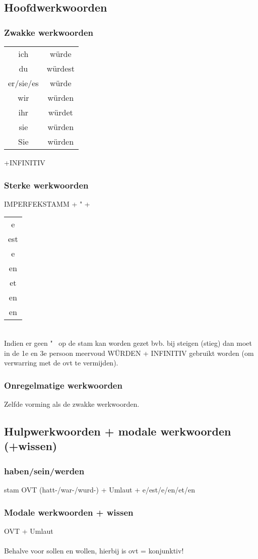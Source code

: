 \documentclass[main.tex]{subfiles}
\begin{document}
\subsection{Hoofdwerkwoorden}
\subsubsection{Zwakke werkwoorden}
\begin{tabular}{cc}

ich & würde \\ 

du & würdest \\ 

er/sie/es & würde \\ 

wir & würden \\ 

ihr & würdet \\ 
 
sie & würden \\ 
Sie & würden  
\end{tabular} 
+INFINITIV
\subsubsection{Sterke werkwoorden}
IMPERFEKSTAMM + " +
\begin{tabular}{c} 
					e\\
					est\\
					e\\
					en\\
					et\\
					en\\
					en\\
									
					
\end{tabular}\\
Indien er geen " \ op de stam kan worden gezet bvb. bij steigen (stieg) dan moet in de 1e en 3e persoon meervoud WÜRDEN + INFINITIV gebruikt worden (om verwarring met de ovt te vermijden).
\subsubsection{Onregelmatige werkwoorden}
Zelfde vorming als de zwakke werkwoorden.
\subsection{Hulpwerkwoorden + modale werkwoorden (+wissen)}
\subsubsection{haben/sein/werden}
stam OVT (hatt-/war-/wurd-) + Umlaut + e/est/e/en/et/en
\subsubsection{Modale werkwoorden + wissen}
OVT + Umlaut\\
\\
Behalve voor sollen en wollen, hierbij is ovt = konjunktiv!
\end{document}
